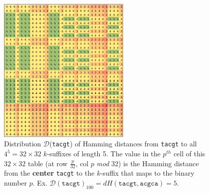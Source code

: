 \begin{figure}[h]
	\centering
	\includegraphics[width=2.5in]{contents/00_images/D(tacgt)}
	\caption{
		Distribution $\mathcal{D}$(\texttt{tacgt}) of Hamming distances from \texttt{tacgt} \cite{sia2015}
		to all $4^{5} = 32\times32$ $k$-suffixes of length 5.
		The value in the $p^{th}$ cell of this $32\times32$ table (at row $\frac{p}{32}$, col $p$ \emph{mod} 32) is the Hamming distance from the \textbf{center} \texttt{tacgt} to the $k$-suffix that maps to the binary number $p$.\newline
		Ex. $\mathcal{D}(\texttt{tacgt})_{100} = dH(\texttt{tacgt}, \texttt{acgca}) = 5$.\newline
	}
	\label{fig:distribution}
\end{figure} 